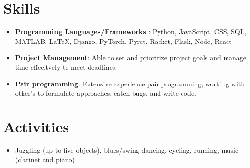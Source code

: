 \documentclass[letterpaper,11pt]{article}
\newcommand{\resumeSubHeadingListStart}{\begin{itemize}[leftmargin=*]}
\newcommand{\resumeSubHeadingListEnd}{\end{itemize}}
\begin{document}
\section{Skills}
  \resumeSubHeadingListStart
    \item \textbf{Programming Languages/Frameworks} : Python, JavaScript, CSS, SQL, MATLAB, \LaTeX, Django, PyTorch, Pyret, Racket, Flask, Node, React
    \item  \textbf{Project Management}: Able to set and prioritize project goals and manage time effecitvely to meet deadlines.
    \item \textbf{Pair programming}: Extensive experience pair programming, working with other's to formulate approaches, catch bugs, and write code.
  \resumeSubHeadingListEnd
\section{Activities}
    \resumeSubHeadingListStart
    \item Juggling (up to five objects), blues/swing dancing, cycling, running, music (clarinet and piano)
  \resumeSubHeadingListEnd
\end{document}
